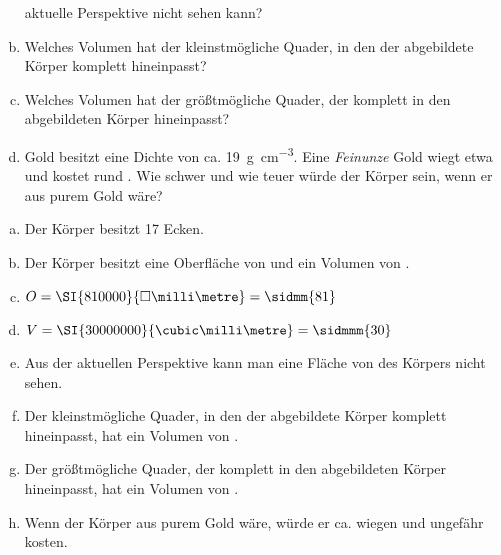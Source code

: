 \begin{exercise}
\begin{enumerate}[a)]
            aktuelle Perspektive nicht sehen kann?
      \item Welches Volumen hat der kleinstmögliche Quader, in den der
            abgebildete Körper komplett hineinpasst?
      \item Welches Volumen hat der größtmögliche Quader, der komplett in den
            abgebildeten Körper hineinpasst?
      \item Gold besitzt eine Dichte von ca. \SI[per-mode=symbol]{19}{\gram\per\cubic\centi\metre}.
            Eine \emph{Feinunze} Gold wiegt etwa  und kostet rund
            . Wie schwer und wie teuer würde der Körper sein, wenn er
            aus purem Gold wäre?
    \end{enumerate}
  \fi
  \ifoutcome\outcome
    \begin{enumerate}[a)]
      \item Der Körper besitzt 17 Ecken.
      \item Der Körper besitzt eine Oberfläche von
             und ein Volumen von
            .
      \item $O=\SI{810000}{\square\milli\metre}=\sidmm{81}$
      \item $V=\SI{30000000}{\cubic\milli\metre}=\sidmmm{30}$
      \item Aus der aktuellen Perspektive kann man eine Fläche von
             des Körpers nicht sehen.
      \item Der kleinstmögliche Quader, in den der abgebildete Körper
            komplett hineinpasst, hat ein Volumen von .
      \item Der größtmögliche Quader, der komplett in den abgebildeten Körper
            hineinpasst, hat ein Volumen von .
      \item Wenn der Körper aus purem Gold wäre, würde er ca. 
            wiegen und ungefähr  kosten.
    \end{enumerate}
  \fi
\end{exercise}
